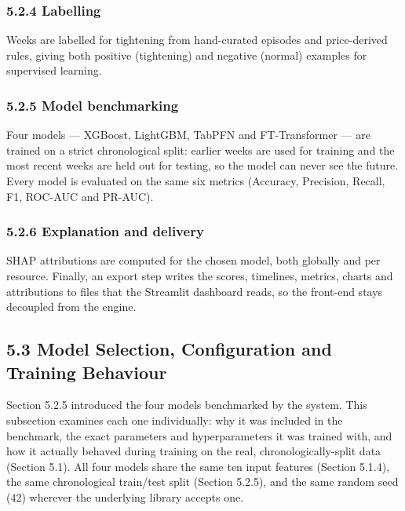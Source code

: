 \documentclass[11pt]{article}
\begin{document}
\subsubsection{5.2.4 Labelling}

Weeks are labelled for tightening from hand-curated episodes and price-derived rules, giving both positive (tightening) and negative (normal) examples for supervised learning.

\subsubsection{5.2.5 Model benchmarking}

Four models --- XGBoost, LightGBM, TabPFN and FT-Transformer --- are trained on a strict chronological split: earlier weeks are used for training and the most recent weeks are held out for testing, so the model can never see the future. Every model is evaluated on the same six metrics (Accuracy, Precision, Recall, F1, ROC-AUC and PR-AUC).

\subsubsection{5.2.6 Explanation and delivery}

SHAP attributions are computed for the chosen model, both globally and per resource. Finally, an export step writes the scores, timelines, metrics, charts and attributions to files that the Streamlit dashboard reads, so the front-end stays decoupled from the engine.

\subsection{5.3 Model Selection, Configuration and Training Behaviour}

Section 5.2.5 introduced the four models benchmarked by the system. This subsection examines each one individually: why it was included in the benchmark, the exact parameters and hyperparameters it was trained with, and how it actually behaved during training on the real, chronologically-split data (Section 5.1). All four models share the same ten input features (Section 5.1.4), the same chronological train/test split (Section 5.2.5), and the same random seed (42) wherever the underlying library accepts one.
\end{document}
